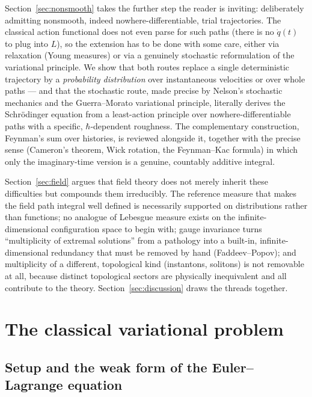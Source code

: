 \documentclass[11pt]{article}
\begin{document}
Section~\ref{sec:nonsmooth} takes the further step the reader is inviting: deliberately admitting nonsmooth, indeed nowhere-differentiable, trial trajectories. The classical action functional does not even parse for such paths (there is no $\dot q(t)$ to plug into $L$), so the extension has to be done with some care, either via relaxation (Young measures) or via a genuinely stochastic reformulation of the variational principle. We show that both routes replace a single deterministic trajectory by a \emph{probability distribution} over instantaneous velocities or over whole paths --- and that the stochastic route, made precise by Nelson's stochastic mechanics and the Guerra--Morato variational principle, literally derives the Schr\"odinger equation from a least-action principle over nowhere-differentiable paths with a specific, $\hbar$-dependent roughness. The complementary construction, Feynman's sum over histories, is reviewed alongside it, together with the precise sense (Cameron's theorem, Wick rotation, the Feynman--Kac formula) in which only the imaginary-time version is a genuine, countably additive integral.

Section~\ref{sec:field} argues that field theory does not merely inherit these difficulties but compounds them irreducibly. The reference measure that makes the field path integral well defined is necessarily supported on distributions rather than functions; no analogue of Lebesgue measure exists on the infinite-dimensional configuration space to begin with; gauge invariance turns ``multiplicity of extremal solutions'' from a pathology into a built-in, infinite-dimensional redundancy that must be removed by hand (Faddeev--Popov); and multiplicity of a different, topological kind (instantons, solitons) is not removable at all, because distinct topological sectors are physically inequivalent and all contribute to the theory. Section~\ref{sec:discussion} draws the threads together.

\section{The classical variational problem}
\label{sec:classical}

\subsection{Setup and the weak form of the Euler--Lagrange equation}
\end{document}
